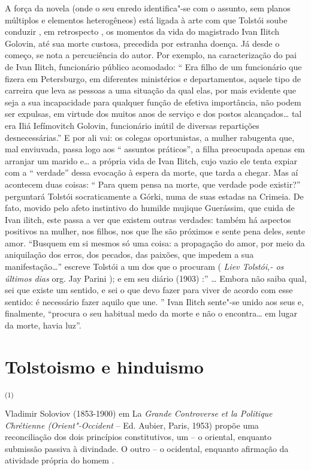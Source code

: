 A força da novela (onde o seu enredo identifica"-se com o assunto, sem
planos múltiplos e elementos heterogêneos) está ligada à arte com que
Tolstói soube conduzir , em retrospecto , os momentos da vida do
magistrado Ivan Ilitch Golovin, até sua morte custosa, precedida por
estranha doença. Já desde o começo, se nota a percuciência do autor. Por
exemplo, na caracterização do pai de Ivan Ilitch, funcionário público
acomodado: `` Era filho de um funcionário que fizera em Petersburgo, em
diferentes ministérios e departamentos, aquele tipo de carreira que leva
as pessoas a uma situação da qual elas, por mais evidente que seja a sua
incapacidade para qualquer função de efetiva importância, não podem ser
expulsas, em virtude dos muitos anos de serviço e dos postos
alcançados\ldots{} tal era Iliá Iefímovitch Golovin, funcionário inútil de
diversas repartições desnecessárias.'' E por ali vai: os colegas
oportunistas, a mulher rabugenta que, mal enviuvada, passa logo aos ``
assuntos práticos'', a filha preocupada apenas em arranjar um marido
e\ldots{} a própria vida de Ivan Ilitch, cujo vazio ele tenta expiar com a ``
verdade'' dessa evocação à espera da morte, que tarda a chegar. Mas aí
acontecem duas coisas: `` Para quem pensa na morte, que verdade pode
existir?'' perguntará Tolstói socraticamente a Górki, numa de suas
estadas na Crimeia. De fato, movido pelo afeto instintivo do humilde
mujique Guerássim, que cuida de Ivan ilitch, este passa a ver que
existem outras verdades: também há aspectos positivos na mulher, nos
filhos, nos que lhe são próximos e sente pena deles, sente amor.
``Busquem em si mesmos só uma coisa: a propagação do amor, por meio da
aniquilação dos erros, dos pecados, das paixões, que impedem a sua
manifestação\ldots{}'' escreve Tolstói a um dos que o procuram ( \emph{Liev
Tolstói,- os últimos dias} org. Jay Parini ); e em seu diário (1903) :''
\ldots{} Embora não saiba qual, sei que existe um sentido, e sei o que devo
fazer para viver de acordo com esse sentido: é necessário fazer aquilo
que une. '' Ivan Ilitch sente"-se unido aos seus e, finalmente, ``procura
o seu habitual medo da morte e não o encontra\ldots{} em lugar da morte,
havia luz''.

\chapter{Tolstoismo e hinduismo}

\textsuperscript{(1)}

Vladimir Soloviov (1853-1900) em La \emph{Grande Controverse et la
Politique Chrétienne (Orient"-Occident} -- Ed. Aubier, Paris, 1953)
propõe uma reconciliação dos dois princípios constitutivos, um -- o
oriental, enquanto submissão passiva à divindade. O outro -- o
ocidental, enquanto afirmação da atividade própria do homem .

